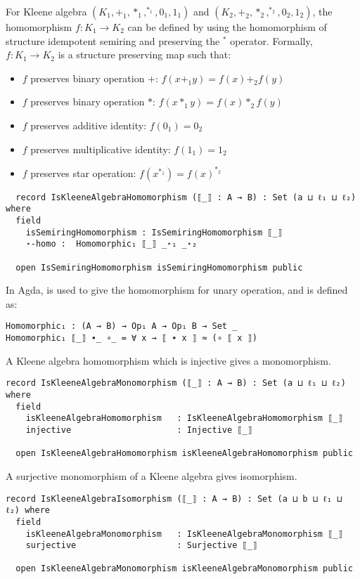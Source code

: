 For Kleene algebra $(K_1,+_1,*_1,^{*_1},0_1,1_1)$ and
$(K_2,+_2,*_2,^{*_2},0_2,1_2)$, the homomorphism $f: K_1 \rightarrow K_2$ can be
defined by using the homomorphism of structure idempotent semiring and
preserving the $^{*}$ operator. Formally, $f: K_1 \rightarrow K_2$ is a
structure preserving map such that:
\begin{itemize}
  \item $f$ preserves binary operation $+$: $f(x +_1 y) = f(x) +_2 f(y)$
  \item $f$ preserves binary operation $*$: $f(x *_1 y) = f(x) *_2 f(y)$
  \item $f$ preserves additive identity: $f(0_1) = 0_2$
  \item $f$ preserves multiplicative identity: $f(1_1) = 1_2$
  \item $f$ preserves star operation: $f(x^{*_1}) = f(x)^{*_2}$
\end{itemize}
\begin{verbatim}
  record IsKleeneAlgebraHomomorphism (⟦_⟧ : A → B) : Set (a ⊔ ℓ₁ ⊔ ℓ₂) where
  field
    isSemiringHomomorphism : IsSemiringHomomorphism ⟦_⟧
    ⋆-homo :  Homomorphic₁ ⟦_⟧ _⋆₁ _⋆₂

  open IsSemiringHomomorphism isSemiringHomomorphism public
\end{verbatim}
In Agda,  is used to give the homomorphism for unary
operation, and is defined as:
\begin{verbatim}
Homomorphic₁ : (A → B) → Op₁ A → Op₁ B → Set _
Homomorphic₁ ⟦_⟧ ∙_ ∘_ = ∀ x → ⟦ ∙ x ⟧ ≈ (∘ ⟦ x ⟧)
\end{verbatim} 
A Kleene algebra homomorphism which is injective gives a monomorphism. 
\begin{verbatim}
record IsKleeneAlgebraMonomorphism (⟦_⟧ : A → B) : Set (a ⊔ ℓ₁ ⊔ ℓ₂) where
  field
    isKleeneAlgebraHomomorphism   : IsKleeneAlgebraHomomorphism ⟦_⟧
    injective                     : Injective ⟦_⟧

  open IsKleeneAlgebraHomomorphism isKleeneAlgebraHomomorphism public
\end{verbatim}

A surjective monomorphism of a Kleene algebra gives isomorphism.
\begin{verbatim}
record IsKleeneAlgebraIsomorphism (⟦_⟧ : A → B) : Set (a ⊔ b ⊔ ℓ₁ ⊔ ℓ₂) where
  field
    isKleeneAlgebraMonomorphism   : IsKleeneAlgebraMonomorphism ⟦_⟧
    surjective                    : Surjective ⟦_⟧

  open IsKleeneAlgebraMonomorphism isKleeneAlgebraMonomorphism public
\end{verbatim}

